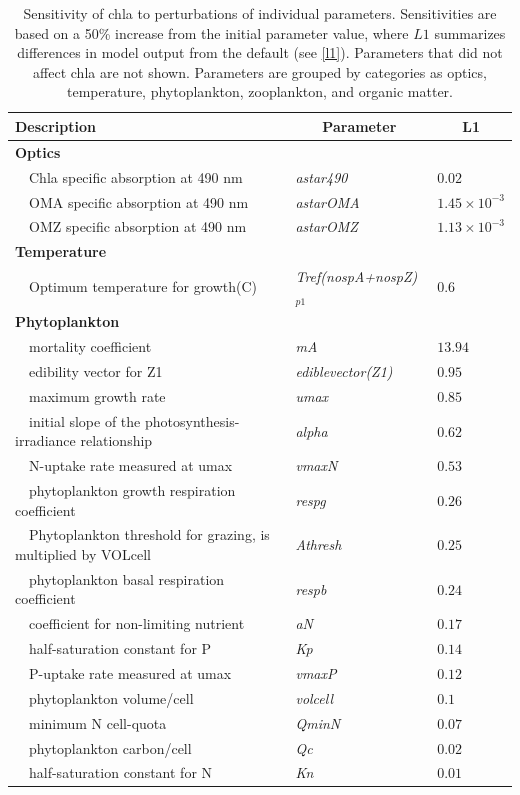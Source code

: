 \documentclass[letterpaper,12pt,oneside]{article}\usepackage[]{graphicx}\usepackage[]{color}
\begin{document}
\begin{table}[!tbp]
{\footnotesize
\caption{Sensitivity of \ac{chla} to perturbations of individual parameters.  Sensitivities are based on a 50\% increase from the initial parameter value, where $L1$ summarizes differences in model output from the default (see \cref{l1}).  Parameters that did not affect \ac{chla} are not shown.  Parameters are grouped by categories as optics, temperature, phytoplankton, zooplankton, and organic matter.\label{tab:chlsens}} 
\begin{center}
\begin{tabular}{lll}
\hline\hline
\multicolumn{1}{l}{Description}&\multicolumn{1}{c}{Parameter}&\multicolumn{1}{c}{L1}\tabularnewline
\hline
{\bfseries Optics}&&\tabularnewline
~~Chla specific absorption at 490 nm&\textit{astar490}&$0.02$\tabularnewline
~~OMA specific absorption at 490 nm&\textit{astarOMA}&$1.45\times 10^{-3}$\tabularnewline
~~OMZ specific absorption at 490 nm&\textit{astarOMZ}&$1.13\times 10^{-3}$\tabularnewline
\hline
{\bfseries Temperature}&&\tabularnewline
~~Optimum temperature for growth(C)&\textit{Tref(nospA+nospZ)$_{p1}$}&$0.6$\tabularnewline
\hline
{\bfseries Phytoplankton}&&\tabularnewline
~~mortality coefficient&\textit{mA}&$13.94$\tabularnewline
~~edibility vector for Z1&\textit{ediblevector(Z1)}&$0.95$\tabularnewline
~~maximum growth rate&\textit{umax}&$0.85$\tabularnewline
~~initial slope of the photosynthesis-irradiance relationship&\textit{alpha}&$0.62$\tabularnewline
~~N-uptake rate measured at umax&\textit{vmaxN}&$0.53$\tabularnewline
~~phytoplankton growth respiration coefficient&\textit{respg}&$0.26$\tabularnewline
~~Phytoplankton threshold for grazing, is multiplied by VOLcell&\textit{Athresh}&$0.25$\tabularnewline
~~phytoplankton basal respiration coefficient&\textit{respb}&$0.24$\tabularnewline
~~coefficient for non-limiting nutrient&\textit{aN}&$0.17$\tabularnewline
~~half-saturation constant for P&\textit{Kp}&$0.14$\tabularnewline
~~P-uptake rate measured at umax&\textit{vmaxP}&$0.12$\tabularnewline
~~phytoplankton volume/cell&\textit{volcell}&$0.1$\tabularnewline
~~minimum N cell-quota&\textit{QminN}&$0.07$\tabularnewline
~~phytoplankton carbon/cell&\textit{Qc}&$0.02$\tabularnewline
~~half-saturation constant for N&\textit{Kn}&$0.01$\tabularnewline

\end{tabular}
\end{center}}
\end{table}
\end{document}
